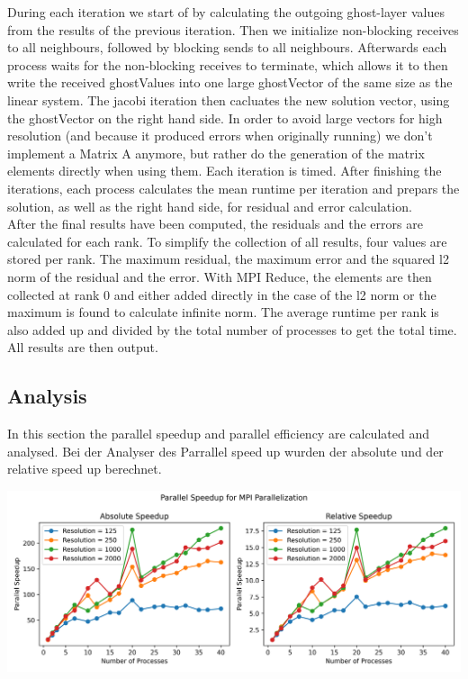 \documentclass[10pt,a4paper]{article}
\begin{document}
During each iteration we start of by calculating the outgoing ghost-layer values from the results of the
previous iteration. Then we initialize non-blocking receives to all neighbours, followed by blocking sends 
to all neighbours. Afterwards each process waits for the non-blocking receives to terminate, which allows 
it to then write the received ghostValues into one large ghostVector of the same size as the linear system.
The jacobi iteration then cacluates the new solution vector, using the ghostVector on the right hand side. 
In order to avoid large vectors for high resolution (and because it produced errors when originally running) we don't implement a Matrix A anymore, but rather do the generation of the matrix elements directly when using them. Each iteration is timed.
After finishing the iterations, each process calculates the mean runtime per iteration and prepars the 
solution, as well as the right hand side, for residual and error calculation. \\

After the final results have been computed, the residuals and the errors are calculated for each rank. To 
simplify the collection of all results, four values are stored per rank. The maximum residual, the 
maximum error and the squared l2 norm of the residual and the error. With MPI Reduce, the elements are then 
collected at rank 0 and either added directly in the case of the l2 norm or the maximum is found to calculate
infinite norm. The average runtime per rank is also added up and divided by the total number of processes 
to get the total time. All results are then output.

\newpage
\subsection{Analysis}

In this section the parallel speedup and parallel efficiency are calculated and analysed. Bei der Analyser 
des Parrallel speed up wurden der absolute und der relative speed up berechnet. 

\begin{center}
    \includegraphics[width=15cm]{analysis/parallelSpeedup_1.png}
\end{center}
\end{document}
